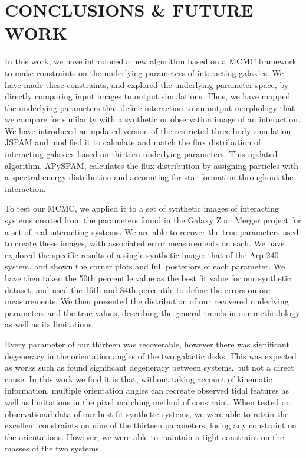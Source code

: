 \section{CONCLUSIONS \& FUTURE WORK}\label{Conclusions}
\noindent In this work, we have introduced a new algorithm based on a MCMC framework to make constraints on the underlying parameters of interacting galaxies. We have made these constraints, and explored the underlying parameter space, by directly comparing input images to output simulations. Thus, we have mapped the underlying parameters that define interaction to an output morphology that we compare for similarity with a synthetic or observation image of an interaction. We have introduced an updated version of the restricted three body simulation JSPAM and modified it to calculate and match the flux distribution of interacting galaxies based on thirteen underlying parameters. This updated algorithm, APySPAM, calculates the flux distribution by assigning particles with a spectral energy distribution and accounting for star formation throughout the interaction. 

To test our MCMC, we applied it to a set of synthetic images of interacting systems created from the parameters found in the Galaxy Zoo: Merger project for a set of real interacting systems. We are able to recover the true parameters used to create these images, with associated error measurements on each. We have explored the specific results of a single synthetic image: that of the Arp 240 system, and shown the corner plots and full posteriors of each parameter. We have then taken the 50th percentile value as the best fit value for our synthetic dataset, and used the 16th and 84th percentile to define the errors on our measurements. We then presented the distribution of our recovered underlying parameters and the true values, describing the general trends in our methodology as well as its limitations. 

Every parameter of our thirteen was recoverable, however there was significant degeneracy in the orientation angles of the two galactic disks. This was expected as works such as \citet{2010ASPC..423..227S} found significant degeneracy between systems, but not a direct cause. In this work we find it is that, without taking account of kinematic information, multiple orientation angles can recreate observed tidal features as well as limitations in the pixel matching method of constraint. When tested on observational data of our best fit synthetic systems, we were able to retain the excellent constraints on nine of the thirteen parameters, losing any constraint on the orientations. However, we were able to maintain a tight constraint on the masses of the two systems. 

